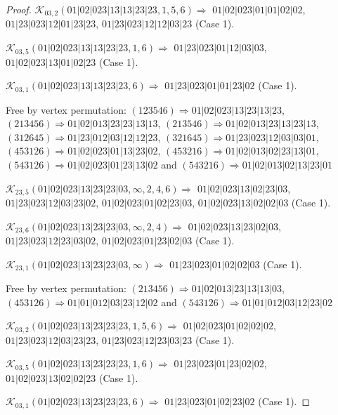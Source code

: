 \documentclass[12pt]{article}
\theoremstyle{plain}
\theoremstyle{definition}
\theoremstyle{remark}
\newcommand{\fancy}[1]{\mathcal{#1}}
\def\K{\fancy{K}}
\begin{document}
\begin{proof}
	$\K_{03,2}(01|02|023|13|13|23|23,1, 5, 6)\Rightarrow $ $01|02|023|01|01|02|02$, $01|23|023|12|01|23|23$, $01|23|023|12|12|03|23$ (Case 1).
	
	$\K_{03,5}(01|02|023|13|13|23|23,1, 6)\Rightarrow $ $01|23|023|01|12|03|03$, $01|02|023|13|01|02|23$ (Case 1).
	
	$\K_{03,1}(01|02|023|13|13|23|23,6)\Rightarrow $ $01|23|023|01|01|23|02$ (Case 1).
	
	
	
	Free by vertex permutation: $(1 2 3 5 4 6)\Rightarrow 01|02|023|13|23|13|23$, $(2 1 3 4 5 6)\Rightarrow 01|02|013|23|23|13|13$, $(2 1 3 5 4 6)\Rightarrow 01|02|013|23|13|23|13$, $(3 1 2 6 4 5)\Rightarrow 01|23|012|03|12|12|23$, $(3 2 1 6 4 5)\Rightarrow 01|23|023|12|03|03|01$, $(4 5 3 1 2 6)\Rightarrow 01|02|023|01|13|23|02$, $(4 5 3 2 1 6)\Rightarrow 01|02|013|02|23|13|01$, $(5 4 3 1 2 6)\Rightarrow 01|02|023|01|23|13|02$ and $(5 4 3 2 1 6)\Rightarrow 01|02|013|02|13|23|01$
	
	
	
	\bigskip
	
	$\K_{23,5}(01|02|023|13|23|23|03,\infty,2, 4, 6)\Rightarrow $ $01|02|023|13|02|23|03$, $01|23|023|12|03|23|02$, $01|02|023|01|02|23|03$, $01|02|023|13|02|02|03$ (Case 1).
	
	$\K_{23,6}(01|02|023|13|23|23|03,\infty,2, 4)\Rightarrow $ $01|02|023|13|23|02|03$, $01|23|023|12|23|03|02$, $01|02|023|01|23|02|03$ (Case 1).
	
	$\K_{23,1}(01|02|023|13|23|23|03,\infty)\Rightarrow $ $01|23|023|01|02|02|03$ (Case 1).
	
	
	
	Free by vertex permutation: $(2 1 3 4 5 6)\Rightarrow 01|02|013|23|13|13|03$, $(4 5 3 1 2 6)\Rightarrow 01|01|012|03|23|12|02$ and $(5 4 3 1 2 6)\Rightarrow 01|01|012|03|12|23|02$
	
	
	
	\bigskip
	
	$\K_{03,2}(01|02|023|13|23|23|23,1, 5, 6)\Rightarrow $ $01|02|023|01|02|02|02$, $01|23|023|12|03|23|23$, $01|23|023|12|23|03|23$ (Case 1).
	
	$\K_{03,5}(01|02|023|13|23|23|23,1, 6)\Rightarrow $ $01|23|023|01|23|02|02$, $01|02|023|13|02|02|23$ (Case 1).
	
	$\K_{03,1}(01|02|023|13|23|23|23,6)\Rightarrow $ $01|23|023|01|02|23|02$ (Case 1).
	
	
	

\end{proof}
\end{document}
